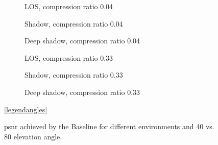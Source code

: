 \documentclass[conference]{IEEEtran}
\newcommand\baseline{Baseline\xspace}
\begin{document}
\begin{figure}
  \begin{subfigure}{.32\linewidth}
  \centering
  
  \caption{LOS, compression ratio 0.04}
  \label{subfig:base4080_los_04}
\end{subfigure}
\hfill
\begin{subfigure}{.32\linewidth}
  \centering
  
  \caption{Shadow, compression ratio 0.04}
  \label{subfig:base4080_shadow_04}
\end{subfigure}
\hfill
\begin{subfigure}{.32\linewidth}
  \centering
  
  \caption{Deep shadow, compression ratio 0.04}
  \label{subfig:base4080_deep_shadow_04}
\end{subfigure}

\vspace{1em}

\begin{subfigure}{.32\linewidth}
  \centering
  
  \caption{LOS, compression ratio 0.33}
  \label{subfig:base4080_los_33}
\end{subfigure}
\hfill
\begin{subfigure}{.32\linewidth}
  \centering
  
  \caption{Shadow, compression ratio 0.33}
  \label{subfig:base4080_shadow_33}
\end{subfigure}
\hfill
\begin{subfigure}{.32\linewidth}
  \centering
  
  \caption{Deep shadow, compression ratio 0.33}
  \label{subfig:base4080_deep_shadow_33}
\end{subfigure}

\vspace{1em}
\centering
\ref{legendangles}

\caption{\ac{psnr} achieved by the \baseline for different environments and 40\textdegree{} vs. 80\textdegree{} elevation angle.}
\label{fig:elevation_angles}
\end{figure}
\end{document}
